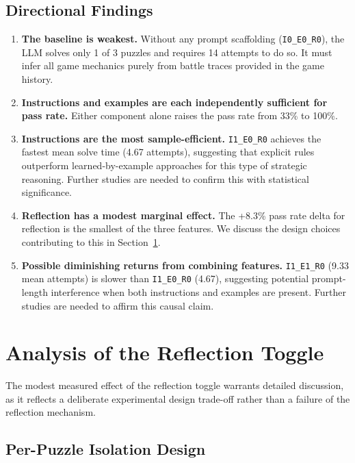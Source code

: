 \documentclass[11pt]{article}
\begin{document}
\subsection{Directional Findings}

\begin{enumerate}[nosep]
    \item \textbf{The baseline is weakest.} Without any prompt scaffolding (\texttt{I0\_E0\_R0}), the LLM solves only 1 of 3 puzzles and requires 14 attempts to do so. It must infer all game mechanics purely from battle traces provided in the game history.
    \item \textbf{Instructions and examples are each independently sufficient for pass rate.} Either component alone raises the pass rate from 33\% to 100\%.
    \item \textbf{Instructions are the most sample-efficient.} \texttt{I1\_E0\_R0} achieves the fastest mean solve time (4.67 attempts), suggesting that explicit rules outperform learned-by-example approaches for this type of strategic reasoning. Further studies are needed to confirm this with statistical significance.
    \item \textbf{Reflection has a modest marginal effect.} The +8.3\% pass rate delta for reflection is the smallest of the three features. We discuss the design choices contributing to this in Section~\ref{sec:reflection-analysis}.
    \item \textbf{Possible diminishing returns from combining features.} \texttt{I1\_E1\_R0} (9.33 mean attempts) is slower than \texttt{I1\_E0\_R0} (4.67), suggesting potential prompt-length interference when both instructions and examples are present. Further studies are needed to affirm this causal claim.
\end{enumerate}

\section{Analysis of the Reflection Toggle}\label{sec:reflection-analysis}

The modest measured effect of the reflection toggle warrants detailed discussion, as it reflects a deliberate experimental design trade-off rather than a failure of the reflection mechanism.

\subsection{Per-Puzzle Isolation Design}
\end{document}
